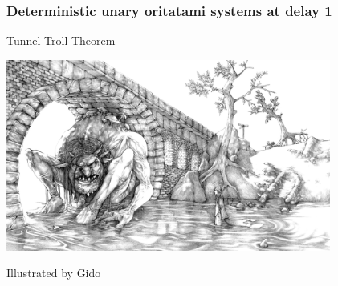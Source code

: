 \begin{frame}\frametitle{Deterministic unary oritatami systems at delay 1}
\begin{center}
Tunnel Troll Theorem
\end{center}
\begin{center}
\includegraphics[width=0.8\textwidth]{fig/troll_bridge___pencils_by_gido_d60evd5.jpg}
\end{center}
\begin{flushright}
{\tiny
Illustrated by Gido
}
\end{flushright}
\end{frame}



